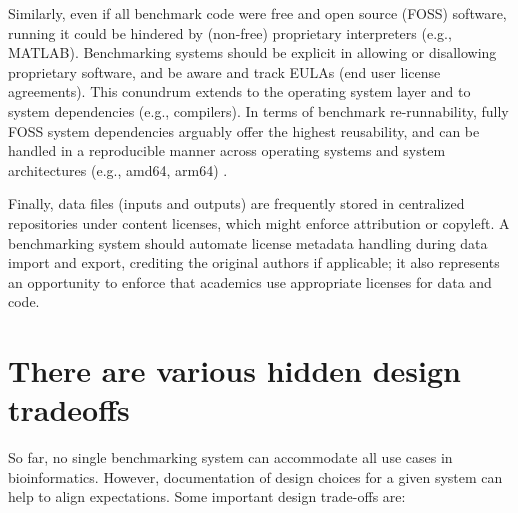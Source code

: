 \documentclass[11pt]{article}
\begin{document}

Similarly, even if all benchmark code were free and open source (FOSS) software, running it could be hindered by (non-free) proprietary interpreters (e.g., MATLAB). Benchmarking systems should be explicit in allowing or disallowing proprietary software, and be aware and track EULAs (end user license agreements). This conundrum extends to the operating system layer and to system dependencies (e.g., compilers). In terms of benchmark re-runnability, fully FOSS system dependencies arguably offer the highest reusability, and can be handled in a reproducible manner across operating systems and system architectures (e.g., amd64, arm64) \cite{droge2023-ax}.

Finally, data files (inputs and outputs) are frequently stored in centralized repositories \cite{Potter2015-fs, Sicilia2017-ko, van-de-Sandt2019-wd} under content licenses, which might enforce attribution or copyleft. A benchmarking system should automate license metadata handling during data import and export, crediting the original authors if applicable; it also represents an opportunity to enforce that academics use appropriate licenses for data and code. 



\section*{There are various hidden design tradeoffs}

So far, no single benchmarking system can accommodate all use cases in bioinformatics. However, documentation of design choices for a given system can help to align expectations. Some important design trade-offs are:
\end{document}

